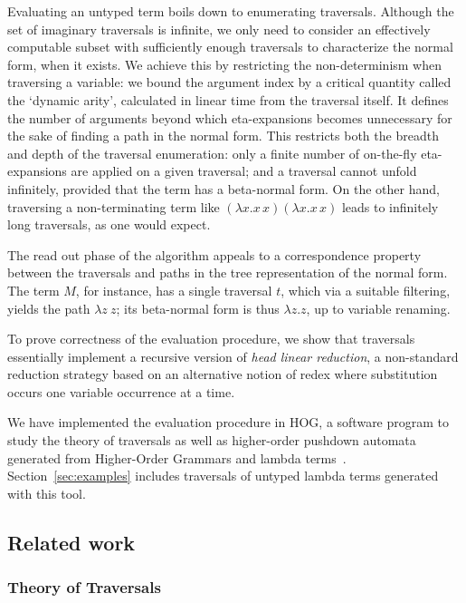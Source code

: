 \documentclass{elsarticle}
\theoremstyle{plain}
\theoremstyle{definition}
\begin{document}
Evaluating an untyped term boils down to enumerating traversals.
 Although the set of imaginary traversals is infinite, we only need to consider an effectively computable subset with sufficiently enough traversals to characterize the normal form, when it exists.
We achieve this by restricting the non-determinism when traversing a variable: we bound the argument index by a critical quantity called the `dynamic arity', calculated in linear time from the traversal itself. It defines the number of arguments beyond which eta-expansions becomes unnecessary for the sake of finding a path in the normal form. This restricts both the breadth and depth of the traversal enumeration: only a finite number of on-the-fly eta-expansions are applied on a given traversal; and a traversal cannot unfold infinitely, provided that the term has a beta-normal form.
On the other hand, traversing a non-terminating term like $(\lambda x. x\,x)(\lambda x. x\,x)$ leads to infinitely long traversals, as one would expect.

The read out phase of the algorithm appeals to a correspondence property between the traversals and paths in the tree representation of the normal form. The term $M$, for instance, has a single traversal $t$, which via a suitable filtering, yields the path $\lambda z ~ z$; its beta-normal form is thus $\lambda z. z$, up to variable renaming.

 To prove correctness of the evaluation procedure, we show that traversals essentially implement a recursive version of \emph{head linear reduction}, a non-standard reduction strategy based on an alternative notion of redex
  where substitution occurs one variable occurrence at a time.

 We have implemented the evaluation procedure in HOG, a software program to study the theory of traversals as well as higher-order pushdown automata generated from Higher-Order Grammars and lambda terms~\cite{BlumGalop2008,Blum-HogTool}.  Section~\ref{sec:examples} includes traversals of untyped lambda terms generated with this tool.

\subsection{Related work}

\subsubsection{Theory of Traversals}
\end{document}

